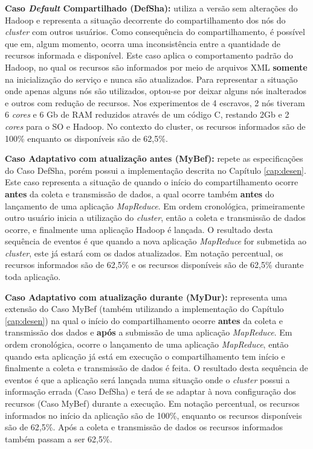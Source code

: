 \textbf{Caso \textit{Default} Compartilhado (DefSha):} utiliza a versão sem alterações do Hadoop e representa a situação decorrente do compartilhamento dos nós do \textit{cluster} com outros usuários. Como consequência do compartilhamento, é possível que em, algum momento, ocorra uma inconsistência entre a quantidade de recursos informada e disponível. Este caso aplica o comportamento padrão do Hadoop, no qual os recursos são informados por meio de arquivos XML \textbf{somente} na inicialização do serviço e nunca são atualizados. Para representar a situação onde apenas alguns nós são utilizados, optou-se por deixar alguns nós inalterados e outros com redução de recursos. Nos experimentos de 4 escravos, 2 nós tiveram 6 \textit{cores} e 6 Gb de RAM reduzidos através de um código C, restando 2Gb e 2 \textit{cores} para o SO e Hadoop. No contexto do cluster, os recursos informados são de 100\% enquanto os disponíveis são de 62,5\%.

\textbf{Caso Adaptativo com atualização antes (MyBef):} repete as especificações do Caso DefSha, porém possui a implementação descrita no Capítulo \ref{cap:desen}. Este caso representa a situação de quando o início do compartilhamento ocorre \textbf{antes} da coleta e transmissão de dados, a qual ocorre também \textbf{antes} do lançamento de uma aplicação \textit{MapReduce}. Em ordem cronológica, primeiramente outro usuário inicia a utilização do \textit{cluster}, então a coleta e transmissão de dados ocorre, e finalmente uma aplicação Hadoop é lançada. O resultado desta sequência de eventos é que quando a nova aplicação \textit{MapReduce} for submetida ao \textit{cluster}, este já estará com os dados atualizados. Em notação percentual, os recursos informados são de 62,5\% e os recursos disponíveis são de 62,5\% durante toda aplicação.

\textbf{Caso Adaptativo com atualização durante (MyDur):} representa uma extensão do Caso MyBef (também utilizando a implementação do Capítulo \ref{cap:desen}) na qual o início do compartilhamento ocorre \textbf{antes} da coleta e transmissão dos dados e \textbf{após} a submissão de uma aplicação \textit{MapReduce}. Em ordem cronológica, ocorre o lançamento de uma aplicação \textit{MapReduce}, então quando esta aplicação já está em execução o compartilhamento tem início e finalmente a coleta e transmissão de dados é feita. O resultado desta sequência de eventos é que a aplicação será lançada numa situação onde o \textit{cluster} possui a informação errada (Caso DefSha) e terá de se adaptar à nova configuração dos recursos (Caso MyBef) durante a execução. Em notação percentual, os recursos informados no início da aplicação são de 100\%, enquanto os recursos disponíveis são de 62,5\%. Após a coleta e transmissão de dados os recursos informados também passam a ser 62,5\%.

